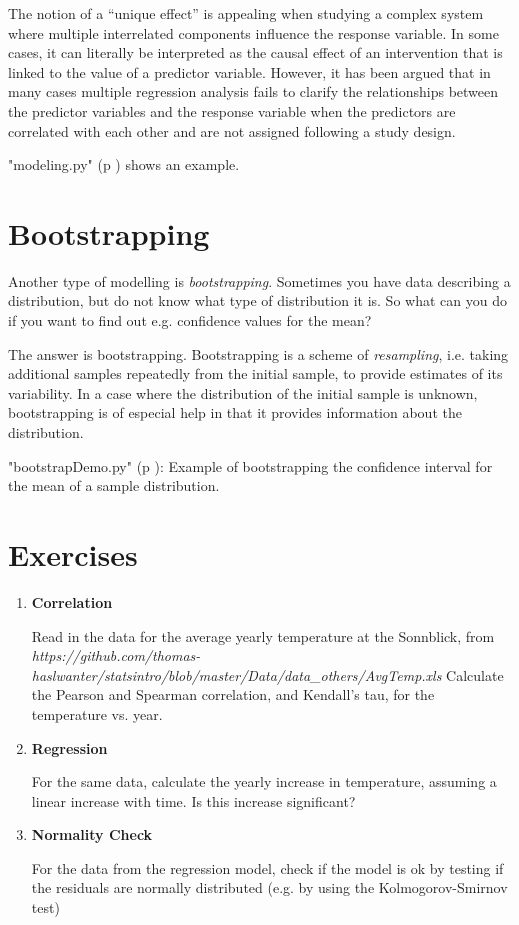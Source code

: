 The notion of a “unique effect” is appealing when studying a complex system where multiple interrelated components influence the response variable. In some cases, it can literally be interpreted as the causal effect of an intervention that is linked to the value of a predictor variable. However, it has been argued that in many cases multiple regression analysis fails to clarify the relationships between the predictor variables and the response variable when the predictors are correlated with each other and are not assigned following a study design.

\PyImg "modeling.py" (p \pageref{py:modeling}) shows an example.

\section{Bootstrapping} 

Another type of modelling is \emph{bootstrapping}. Sometimes you have data describing a distribution, but do not know what type of distribution it is. So what can you do if you want to find out e.g. confidence values for the mean?

The answer is bootstrapping. Bootstrapping is a scheme of \emph{resampling}, i.e. taking additional samples repeatedly from the initial sample, to provide estimates of its variability. In a case where the distribution of the initial sample is unknown, bootstrapping is of especial help in that it provides information about the distribution.

\PyImg "bootstrapDemo.py" (p \pageref{py:bootstrapDemo}): Example of bootstrapping the confidence interval for the mean of a sample distribution.
\section{Exercises}

\begin{enumerate}
  \item \textbf{Correlation}

    Read in the data for the average yearly temperature at the Sonnblick, from     \emph{https://github.com/thomas-haslwanter/statsintro/blob/master/Data/data\_others/AvgTemp.xls}
    Calculate the Pearson and Spearman correlation, and Kendall's tau, for the temperature vs. year.

  \item \textbf{Regression}

    For the same data, calculate the yearly increase in temperature, assuming a linear increase with time.
    Is this increase significant?

  \item \textbf{Normality Check}

    For the data from the regression model, check if the model is ok by testing if the residuals are normally distributed (e.g. by using the Kolmogorov-Smirnov test)

\end{enumerate}


